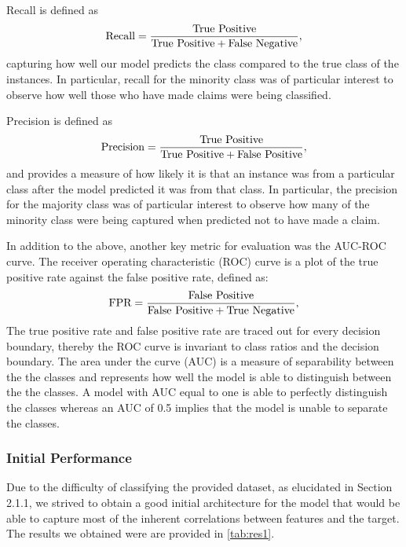  Recall is defined as 
\begin{equation}
\textnormal{Recall}=\frac{\textnormal{True Positive}}{\textnormal{True Positive}+\textnormal{False Negative}},
\end{equation}
capturing how well our model predicts the class compared to the true class of the instances. In particular, recall for the minority class was of particular interest to observe how well those who have made claims were being classified.

Precision is defined as
\begin{equation}
\textnormal{Precision}=\frac{\textnormal{True Positive}}{\textnormal{True Positive}+\textnormal{False Positive}},
\end{equation}
and provides a measure of how likely it is that an instance was from a particular class after the model predicted it was from that class. In particular, the precision for the majority class was of particular interest to observe how many of the minority class were being captured when predicted not to have made a claim.

In addition to the above, another key metric for evaluation was the AUC-ROC curve. The receiver operating characteristic (ROC) curve is a plot of the true positive rate against the false positive rate, defined as:
\begin{equation}
\textnormal{FPR}=\frac{\textnormal{False Positive}}{\textnormal{False Positive}+\textnormal{True Negative}},
\end{equation}
\noindent The true positive rate and false positive rate are traced out for every decision boundary, thereby the ROC curve is invariant to class ratios and the decision boundary. The area under the curve (AUC) is a measure of separability between the the classes and represents how well the model is able to distinguish between the the classes. A model with AUC equal to one is able to perfectly distinguish the classes whereas an AUC of 0.5 implies that the model is unable to separate the classes.

\subsubsection*{Initial Performance}

Due to the difficulty of classifying the provided dataset, as elucidated in Section 2.1.1, we strived to obtain a good initial architecture for the model that would be able to capture most of the inherent correlations between features and the target. The results we obtained were are provided in \autoref{tab:res1}.

